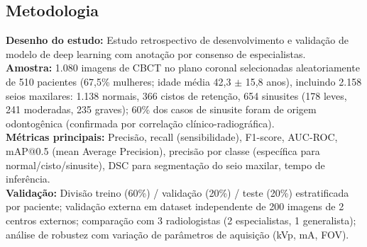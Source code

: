 \subsection{Metodologia}
\textbf{Desenho do estudo:} Estudo retrospectivo de desenvolvimento e
validação de modelo de deep learning com anotação por consenso de
especialistas. \\
\textbf{Amostra:} 1.080 imagens de CBCT no plano coronal selecionadas
aleatoriamente de 510 pacientes (67,5\% mulheres; idade média 42,3
$\pm$ 15,8 anos), incluindo 2.158 seios maxilares: 1.138 normais,
366 cistos de retenção, 654 sinusites (178 leves, 241 moderadas, 235
graves); 60\% dos casos de sinusite foram de origem odontogênica
(confirmada por correlação clínico-radiográfica). \\
\textbf{Métricas principais:} Precisão, recall (sensibilidade), F1-score,
AUC-ROC, mAP@0.5 (mean Average Precision), precisão por classe
(específica para normal/cisto/sinusite), DSC para segmentação do
seio maxilar, tempo de inferência. \\
\textbf{Validação:} Divisão treino (60\%) / validação (20\%) / teste
(20\%) estratificada por paciente; validação externa em dataset
independente de 200 imagens de 2 centros externos; comparação com
3 radiologistas (2 especialistas, 1 generalista); análise de
robustez com variação de parâmetros de aquisição (kVp, mA, FOV).


